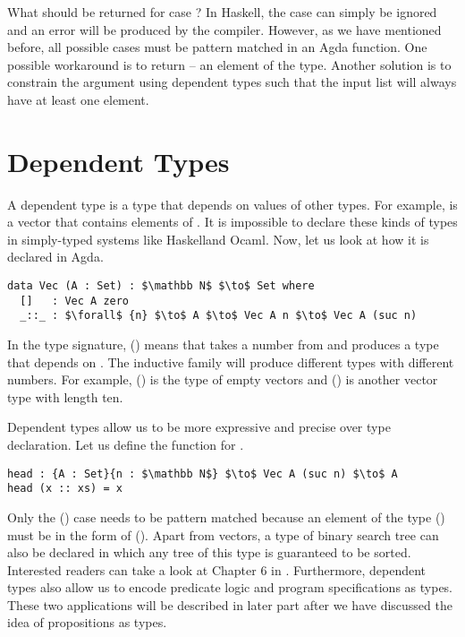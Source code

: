 \par What should be returned for case \mb{[\ ]}? In Haskell, the \mb{[\
  ]} case can simply be ignored and an error will be produced by the
compiler. However, as we have mentioned
before, all possible cases must be pattern matched in an Agda function. One
possible workaround is to return \mb{nothing} -- an element of the
\mb{Maybe} type. Another solution is
to constrain the argument using dependent types such that the input
list will always have at least one element. 


\section{Dependent Types}
\par A dependent type is a type that depends on values of other
types. For example,  is a vector that contains  elements
of \mb{A}. It is impossible to declare these kinds of types in
simply-typed systems like Haskell\footnotemark and Ocaml. Now, let
us look at how it is declared in Agda.
\begin{lstlisting}[mathescape=true,xleftmargin=.3\textwidth]
data Vec (A : Set) : $\mathbb N$ $\to$ Set where
  []   : Vec A zero
  _::_ : $\forall$ {n} $\to$ A $\to$ Vec A n $\to$ Vec A (suc n)
\end{lstlisting} 

\par In the type signature, () means
that  takes a number  from  and produces a
type that depends on \mb{n}. The inductive family \mb{Vec} will
produce different types with different numbers. For example, () is
the type of empty vectors and (\mb{Vec\ A\ 10}) is another vector type with length ten. 

\par Dependent types allow us to be more
expressive and precise over type declaration. Let us define the
 function for . 
\begin{lstlisting}[mathescape=true,xleftmargin=.3\textwidth]
head : {A : Set}{n : $\mathbb N$} $\to$ Vec A (suc n) $\to$ A
head (x :: xs) = x 
\end{lstlisting} 

\par Only the () case needs to be pattern matched because
an element of the type (\mb{Vec\ A\ (suc\ n)}) must be in the form of
(\mb{x :: xs}). Apart from vectors, a type of binary
search tree can also be declared in which any tree of this type is guaranteed to be
sorted. Interested readers can take a look at 
Chapter 6 in \cite{bove2009}. Furthermore, dependent types also allow
us to encode predicate logic and program specifications as
types. These two applications will be described in later part after we
have discussed the idea of propositions as types. 


